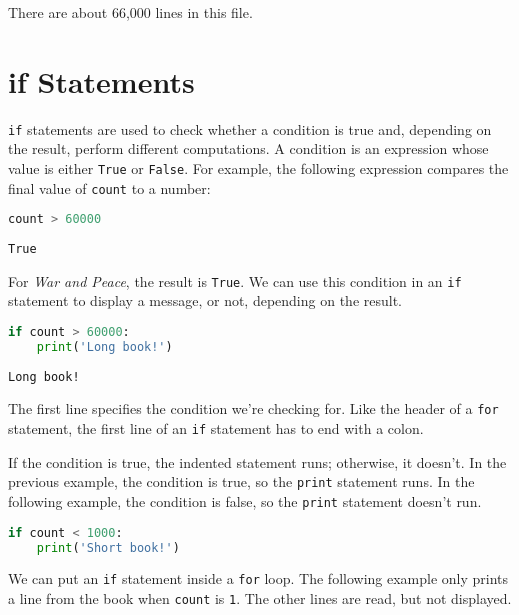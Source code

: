 There are about 66,000 lines in this file.

\section{if Statements}\label{if-statements}

\passthrough{\lstinline!if!} statements are used to check whether a
condition is true and, depending on the result, perform different
computations. A condition is an expression whose value is either
\passthrough{\lstinline!True!} or \passthrough{\lstinline!False!}. For
example, the following expression compares the final value of
\passthrough{\lstinline!count!} to a number:

\begin{lstlisting}[language=Python,style=source]
count > 60000
\end{lstlisting}

\begin{lstlisting}[style=output]
True
\end{lstlisting}

For \emph{War and Peace}, the result is \passthrough{\lstinline!True!}.
We can use this condition in an \passthrough{\lstinline!if!} statement
to display a message, or not, depending on the result.

\begin{lstlisting}[language=Python,style=source]
if count > 60000:
    print('Long book!')
\end{lstlisting}

\begin{lstlisting}[style=output]
Long book!
\end{lstlisting}

The first line specifies the condition we're checking for. Like the
header of a \passthrough{\lstinline!for!} statement, the first line of
an \passthrough{\lstinline!if!} statement has to end with a colon.

If the condition is true, the indented statement runs; otherwise, it
doesn't. In the previous example, the condition is true, so the
\passthrough{\lstinline!print!} statement runs. In the following
example, the condition is false, so the \passthrough{\lstinline!print!}
statement doesn't run.

\begin{lstlisting}[language=Python,style=source]
if count < 1000:
    print('Short book!')
\end{lstlisting}

We can put an \passthrough{\lstinline!if!} statement inside a
\passthrough{\lstinline!for!} loop. The following example only prints a
line from the book when \passthrough{\lstinline!count!} is
\passthrough{\lstinline!1!}. The other lines are read, but not
displayed.

